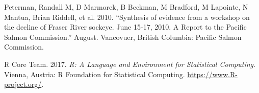 \documentclass[fleqn,10pt]{wlpeerj} %
\begin{document}
\hypertarget{ref-Peterman2010}{}
Peterman, Randall M, D Marmorek, B Beckman, M Bradford, M Lapointe, N
Mantua, Brian Riddell, et al. 2010. ``Synthesis of evidence from a
workshop on the decline of Fraser River sockeye. June 15-17, 2010. A
Report to the Pacific Salmon Commission.'' August. Vancovuer, British
Columbia: Pacific Salmon Commission.

\hypertarget{ref-R}{}
R Core Team. 2017. \emph{R: A Language and Environment for Statistical
Computing}. Vienna, Austria: R Foundation for Statistical Computing.
\url{https://www.R-project.org/}.
\end{document}
